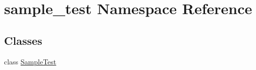 \hypertarget{namespacesample__test}{\section{sample\-\_\-test Namespace Reference}
\label{namespacesample__test}
}
\subsection*{Classes}
\begin{DoxyCompactItemize}
\item 
class \hyperlink{classsample__test_1_1_sample_test}{Sample\-Test}
\end{DoxyCompactItemize}
